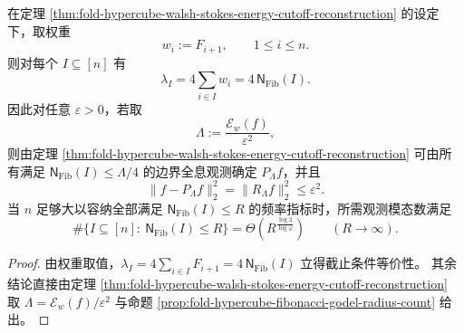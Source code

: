 \begin{corollary}[斐波那契权重下的截止谱可见性与多项式维数律]\label{cor:fold-hypercube-fibonacci-godel-spectrum-polynomial}
在定理 \ref{thm:fold-hypercube-walsh-stokes-energy-cutoff-reconstruction} 的设定下，取权重
\[
w_i:=F_{i+1},\qquad 1\le i\le n.
\]
则对每个 \(I\subseteq[n]\) 有
\[
\lambda_I=4\sum_{i\in I}w_i=4\,\mathsf N_{\mathrm{Fib}}(I).
\]
因此对任意 \(\varepsilon>0\)，若取
\[
\Lambda:=\frac{\mathcal E_w(f)}{\varepsilon^2},
\]
则由定理 \ref{thm:fold-hypercube-walsh-stokes-energy-cutoff-reconstruction} 可由所有满足 \(\mathsf N_{\mathrm{Fib}}(I)\le \Lambda/4\) 的边界全息观测确定 \(P_\Lambda f\)，并且
\[
\|f-P_\Lambda f\|_2^2=\|R_\Lambda f\|_2^2\le \varepsilon^2.
\]
当 \(n\) 足够大以容纳全部满足 \(\mathsf N_{\mathrm{Fib}}(I)\le R\) 的频率指标时，所需观测模态数满足
\[
\#\{I\subseteq[n]:\ \mathsf N_{\mathrm{Fib}}(I)\le R\}
=
\Theta\!\left(R^{\frac{\log 2}{\log\varphi}}\right)
\qquad(R\to\infty).
\]
\end{corollary}
\begin{proof}
由权重取值，\(\lambda_I=4\sum_{i\in I}F_{i+1}=4\,\mathsf N_{\mathrm{Fib}}(I)\) 立得截止条件等价性。
其余结论直接由定理 \ref{thm:fold-hypercube-walsh-stokes-energy-cutoff-reconstruction} 取 \(\Lambda=\mathcal E_w(f)/\varepsilon^2\) 与命题 \ref{prop:fold-hypercube-fibonacci-godel-radius-count} 给出。
\end{proof}

